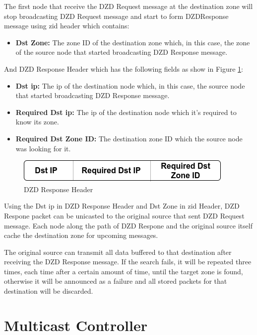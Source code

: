 The first node that receive the DZD Request message at the destination zone will stop broadcasting DZD Request message and start to form DZDResponse message using \acrshort{zid} header which contains:
\begin{itemize}[itemsep=1pt, topsep=5pt]
    \item \textbf{Dst Zone:} The zone ID of the destination zone which, in this case, the zone of the source node that started broadcasting DZD Response message.
\end{itemize} 

And DZD Response Header which has the following fields as show in Figure \ref{fig:dzd-response}: 
\begin{itemize}[itemsep=1pt, topsep=5pt]
    \item \textbf{Dst \acrshort{ip}:} The \acrshort{ip} of the destination node which, in this case, the source node that started broadcasting DZD Response message.
    \item \textbf{Required Dst \acrshort{ip}:} The \acrshort{ip} of the destination node which it's required to know its zone.
    \item \textbf{Required Dst Zone ID:} The destination zone ID which the source node was looking for it.
\end{itemize} 

\begin{figure}[!htb]
    \centering
    \includegraphics[scale=0.7]{images/dzdresponse_header.png}
    \caption{DZD Response Header}
    \label{fig:dzd-response}
\end{figure} 

Using the Dst \acrshort{ip} in DZD Response Header and Dst Zone in \acrshort{zid} Header, DZD Respone packet can be unicasted to the original source that sent DZD Request message. Each node along the path of DZD Respone and the original source itself cache the destination zone for upcoming messages.

The original source can transmit all data buffered to that destination after receiving the DZD Response message. If the search fails, it will be repeated three times, each time after a certain amount of time, until the target zone is found, otherwise it will be announced as a failure and all stored packets for that destination will be discarded.

\section{Multicast Controller}
